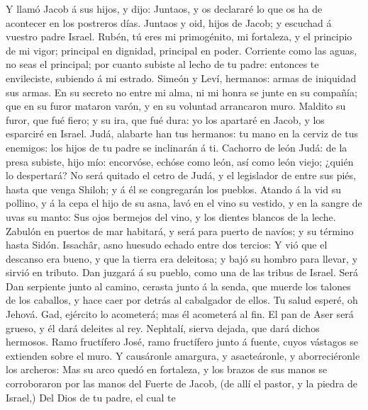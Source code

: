  Y llamó Jacob á sus hijos, y dijo: Juntaos, y os declararé
lo que os ha de acontecer en los postreros días.  Juntaos y
oid, hijos de Jacob; y escuchad á vuestro padre Israel. 
Rubén, tú eres mi primogénito, mi fortaleza, y el principio de mi vigor;
principal en dignidad, principal en poder.  Corriente como
las aguas, no seas el principal; por cuanto subiste al lecho de tu
padre: entonces te envileciste, subiendo á mi estrado. 
Simeón y Leví, hermanos: armas de iniquidad sus armas.  En
su secreto no entre mi alma, ni mi honra se junte en su compañía; que en
su furor mataron varón, y en su voluntad arrancaron muro. 
Maldito su furor, que fué fiero; y su ira, que fué dura: yo los apartaré
en Jacob, y los esparciré en Israel.  Judá, alabarte han tus
hermanos: tu mano en la cerviz de tus enemigos: los hijos de tu padre se
inclinarán á ti.  Cachorro de león Judá: de la presa
subiste, hijo mío: encorvóse, echóse como león, así como león viejo;
¿quién lo despertará?  No será quitado el cetro de Judá, y
el legislador de entre sus piés, hasta que venga Shiloh; y á él se
congregarán los pueblos.  Atando á la vid su pollino, y á
la cepa el hijo de su asna, lavó en el vino su vestido, y en la sangre
de uvas su manto:  Sus ojos bermejos del vino, y los
dientes blancos de la leche.  Zabulón en puertos de mar
habitará, y será para puerto de navíos; y su término hasta Sidón.
 Issachâr, asno huesudo echado entre dos tercios:
 Y vió que el descanso era bueno, y que la tierra era
deleitosa; y bajó su hombro para llevar, y sirvió en tributo.
 Dan juzgará á su pueblo, como una de las tribus de Israel.
 Será Dan serpiente junto al camino, cerasta junto á la
senda, que muerde los talones de los caballos, y hace caer por detrás al
cabalgador de ellos.  Tu salud esperé, oh Jehová.
 Gad, ejército lo acometerá; mas él acometerá al fin.
 El pan de Aser será grueso, y él dará deleites al rey.
 Nephtalí, sierva dejada, que dará dichos hermosos.
 Ramo fructífero José, ramo fructífero junto á fuente,
cuyos vástagos se extienden sobre el muro.  Y causáronle
amargura, y asaeteáronle, y aborreciéronle los archeros: 
Mas su arco quedó en fortaleza, y los brazos de sus manos se
corroboraron por las manos del Fuerte de Jacob, (de allí el pastor, y la
piedra de Israel,)  Del Dios de tu padre, el cual te
